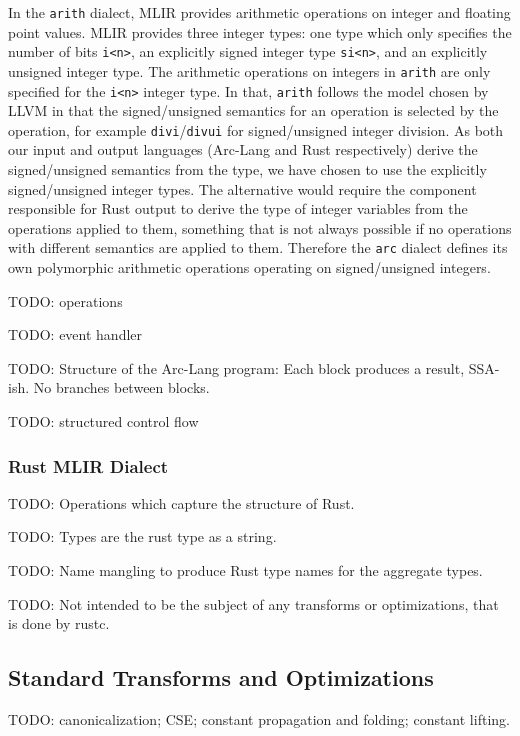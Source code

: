 In the \texttt{arith} dialect, MLIR provides arithmetic operations on integer and floating point values. MLIR provides three integer types: one type which only specifies the number of bits \texttt{i<n>}, an explicitly signed integer type \texttt{si<n>}, and an explicitly unsigned integer type. The arithmetic operations on integers in \texttt{arith} are only specified for the \texttt{i<n>} integer type. In that, \texttt{arith} follows the model chosen by LLVM in that the signed/unsigned semantics for an operation is selected by the operation, for example \texttt{divi}/\texttt{divui} for signed/unsigned integer division. As both our input and output languages (Arc-Lang and Rust respectively) derive the signed/unsigned semantics from the type, we have chosen to use the explicitly signed/unsigned integer types. The alternative would require the component responsible for Rust output to derive the type of integer variables from the operations applied to them, something that is not always possible if no operations with different semantics are applied to them. Therefore the \texttt{arc} dialect defines its own polymorphic arithmetic operations operating on signed/unsigned integers.

TODO: operations

TODO: event handler

TODO: Structure of the Arc-Lang program: Each block produces a result, SSA-ish. No branches between blocks.

TODO: structured control flow

\subsubsection{Rust MLIR Dialect}

TODO: Operations which capture the structure of Rust.

TODO: Types are the rust type as a string.

TODO: Name mangling to produce Rust type names for the aggregate types.

TODO: Not intended to be the subject of any transforms or optimizations, that is done by rustc.

\subsection{Standard Transforms and Optimizations}

TODO: canonicalization; CSE; constant propagation and folding; constant lifting.

